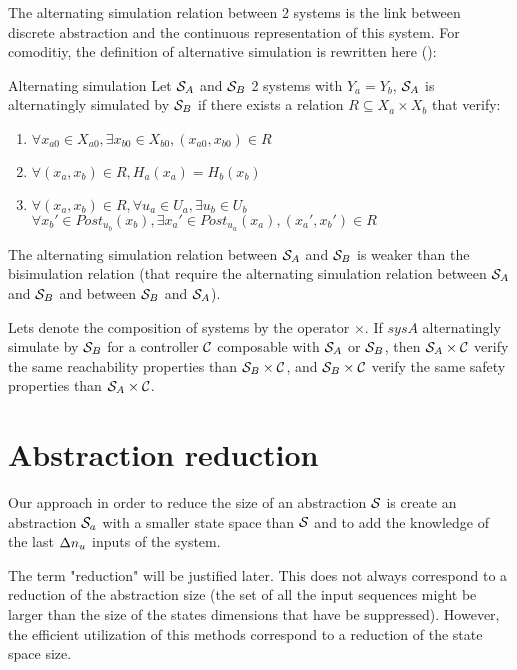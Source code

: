 The alternating simulation relation between 2 systems is the link between discrete abstraction and the continuous representation of this system.
For comoditiy, the definition of alternative simulation is rewritten here (\cite{tabuada2009verification}):
\begin{nameddef}{Alternating simulation} \label{def_alt_sim}
Let $\mathcal{S}_A$ and $\mathcal{S}_B$ 2 systems with $Y_a=Y_b$, $\mathcal{S}_A$ is alternatingly simulated by $\mathcal{S}_B$ if there exists a relation $R \subseteq X_a \times X_b$ that verify:
\begin{enumerate}
\item $\forall x_{a0} \in X_{a0}, \exists x_{b0} \in X_{b0}, (x_{a0},x_{b0}) \in R$
\item $\forall (x_a,x_b) \in R, H_a(x_a) = H_b(x_b)$
\item $\forall (x_a,x_b) \in R, \forall u_{a} \in U_{a}, \exists u_{b} \in U_{b}$\\
$\forall x_b' \in Post_{u_b}(x_b),\exists x_a' \in Post_{u_a}(x_a), (x_a',x_b') \in R$
\popQED
\end{enumerate}
\end{nameddef}
The alternating simulation relation between $\mathcal{S}_A$ and $\mathcal{S}_B$ is weaker than the bisimulation relation (that require the alternating simulation relation between $\mathcal{S}_A$ and $\mathcal{S}_B$ and between $\mathcal{S}_B$ and $\mathcal{S}_A$).

Lets denote the composition of systems by the operator $\times$.
If $sysA$ alternatingly simulate by $\mathcal{S}_B$ for a controller $\mathcal{C}$ composable with $\mathcal{S}_A$ or $\mathcal{S}_B$, then $\mathcal{S}_A \times \mathcal{C}$ verify the same reachability properties than $\mathcal{S}_B \times \mathcal{C}$, and $\mathcal{S}_B \times \mathcal{C}$ verify the same safety properties than $\mathcal{S}_A \times \mathcal{C}$.

\section{Abstraction reduction}
Our approach in order to reduce the size of an abstraction $\mathcal{S}$ is create an abstraction $\mathcal{S}_a$ with a smaller state space than $\mathcal{S}$ and to add the knowledge of the last $\Delta n_u$ inputs of the system.

The term "reduction" will be justified later. This does not always correspond to a reduction of the abstraction size (the set of all the input sequences might be larger than the size of the states dimensions that have be suppressed). However, the efficient utilization of this methods correspond to a reduction of the state space size.

